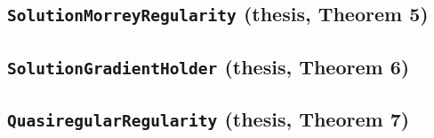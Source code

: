 \documentclass[11pt]{amsart}
\theoremstyle{definition}
\begin{document}
\subsection{\texorpdfstring{\texttt{SolutionMorreyRegularity} (thesis, Theorem 5)}{SolutionMorreyRegularity}}\label{node:SolutionMorreyRegularity}


\subsection{\texorpdfstring{\texttt{SolutionGradientHolder} (thesis, Theorem 6)}{SolutionGradientHolder}}\label{node:SolutionGradientHolder}


\subsection{\texorpdfstring{\texttt{QuasiregularRegularity} (thesis, Theorem 7)}{QuasiregularRegularity}}\label{node:QuasiregularRegularity}

\end{document}
